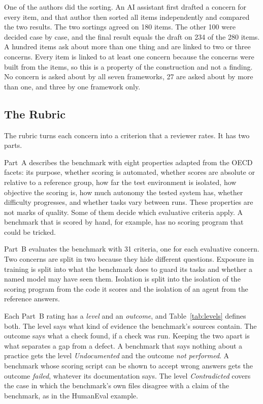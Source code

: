 \documentclass[runningheads]{llncs}
\begin{document}
One of the authors did the sorting. An AI assistant first drafted a concern for every item, and that author then sorted all items independently and compared the two results. The two sortings agreed on 180 items. The other 100 were decided case by case, and the final result equals the draft on 234 of the 280 items. A hundred items ask about more than one thing and are linked to two or three concerns. Every item is linked to at least one concern because the concerns were built from the items, so this is a property of the construction and not a finding. No concern is asked about by all seven frameworks, 27 are asked about by more than one, and three by one framework only.

\subsection{The Rubric}
\label{sec:levels}
The rubric turns each concern into a criterion that a reviewer rates. It has two parts.

Part~A describes the benchmark with eight properties adapted from the OECD facets: its purpose, whether scoring is automated, whether scores are absolute or relative to a reference group, how far the test environment is isolated, how objective the scoring is, how much autonomy the tested system has, whether difficulty progresses, and whether tasks vary between runs. These properties are not marks of quality. Some of them decide which evaluative criteria apply. A benchmark that is scored by hand, for example, has no scoring program that could be tricked.

Part~B evaluates the benchmark with 31 criteria, one for each evaluative concern. Two concerns are split in two because they hide different questions. Exposure in training is split into what the benchmark does to guard its tasks and whether a named model may have seen them. Isolation is split into the isolation of the scoring program from the code it scores and the isolation of an agent from the reference answers.

Each Part~B rating has a \emph{level} and an \emph{outcome}, and Table~\ref{tab:levels} defines both. The level says what kind of evidence the benchmark's sources contain. The outcome says what a check found, if a check was run. Keeping the two apart is what separates a gap from a defect. A benchmark that says nothing about a practice gets the level \emph{Undocumented} and the outcome \emph{not performed}. A benchmark whose scoring script can be shown to accept wrong answers gets the outcome \emph{failed}, whatever its documentation says. The level \emph{Contradicted} covers the case in which the benchmark's own files disagree with a claim of the benchmark, as in the HumanEval example.
\end{document}
